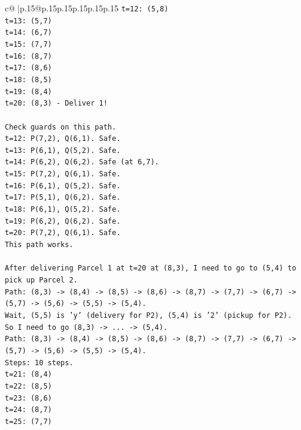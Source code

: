 \documentclass{article}
\begin{document}
{\begin{supertabular}{c@{$\;$}|p{.15\linewidth}@{}p{.15\linewidth}p{.15\linewidth}p{.15\linewidth}p{.15\linewidth}p{.15\linewidth}}
{{{\texttt{t=12: (5,8)} \\
\texttt{t=13: (5,7)} \\
\texttt{t=14: (6,7)} \\
\texttt{t=15: (7,7)} \\
\texttt{t=16: (8,7)} \\
\texttt{t=17: (8,6)} \\
\texttt{t=18: (8,5)} \\
\texttt{t=19: (8,4)} \\
\texttt{t=20: (8,3) {-} Deliver 1!} \\
\\ 
\texttt{Check guards on this path.} \\
\texttt{t=12: P(7,2), Q(6,1). Safe.} \\
\texttt{t=13: P(6,1), Q(5,2). Safe.} \\
\texttt{t=14: P(6,2), Q(6,2). Safe (at 6,7).} \\
\texttt{t=15: P(7,2), Q(6,1). Safe.} \\
\texttt{t=16: P(6,1), Q(5,2). Safe.} \\
\texttt{t=17: P(5,1), Q(6,2). Safe.} \\
\texttt{t=18: P(6,1), Q(5,2). Safe.} \\
\texttt{t=19: P(6,2), Q(6,2). Safe.} \\
\texttt{t=20: P(7,2), Q(6,1). Safe.} \\
\texttt{This path works.} \\
\\ 
\texttt{After delivering Parcel 1 at t=20 at (8,3), I need to go to (5,4) to pick up Parcel 2.} \\
\texttt{Path: (8,3) {-}> (8,4) {-}> (8,5) {-}> (8,6) {-}> (8,7) {-}> (7,7) {-}> (6,7) {-}> (5,7) {-}> (5,6) {-}> (5,5) {-}> (5,4).} \\
\texttt{Wait, (5,5) is 'y' (delivery for P2), (5,4) is '2' (pickup for P2).} \\
\texttt{So I need to go (8,3) {-}> ... {-}> (5,4).} \\
\texttt{Path: (8,3) {-}> (8,4) {-}> (8,5) {-}> (8,6) {-}> (8,7) {-}> (7,7) {-}> (6,7) {-}> (5,7) {-}> (5,6) {-}> (5,5) {-}> (5,4).} \\
\texttt{Steps: 10 steps.} \\
\texttt{t=21: (8,4)} \\
\texttt{t=22: (8,5)} \\
\texttt{t=23: (8,6)} \\
\texttt{t=24: (8,7)} \\
\texttt{t=25: (7,7)} \\
}}}
\end{supertabular}}
\end{document}
